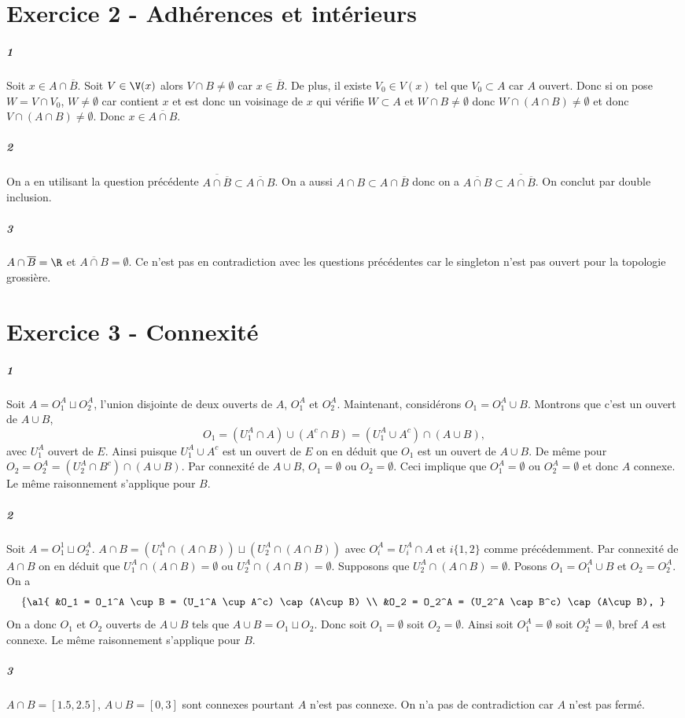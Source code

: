 \documentclass[10pt,a4paper]{article}
\begin{document}
\section{Exercice 2 - Adhérences et intérieurs}
\subparagraph{1} Soit $x \in A \cap \overline{B}$. Soit $V \in \V(x)$ alors $V\cap B \neq \emptyset$ car $x \in \overline{B}$. De plus, il existe $V_0 \in V(x)$ tel que $V_0 \subset A$ car $A$ ouvert. Donc si on pose $W = V \cap V_0$, $W\neq \emptyset$ car contient $x$ et est donc un voisinage de $x$ qui vérifie $W \subset A$ et $W \cap B \neq \emptyset$ donc $W \cap (A \cap B) \neq \emptyset$ et donc $V \cap (A \cap B) \neq \emptyset$. Donc $x \in \overline{A \cap B}$.
\subparagraph{2} On a en utilisant la question précédente $\overline{A \cap \overline{B}} \subset \overline{A \cap B}$. On a aussi $A \cap B \subset A \cap \overline{B}$ donc on a $ \overline{A \cap B} \subset \overline{A \cap \overline{B}}$. On conclut par double inclusion.
\subparagraph{3}$A\cap \overline{B} = \R$ et $\overline{A \cap B} = \emptyset$. Ce n'est pas en contradiction avec les questions précédentes car le singleton n'est pas ouvert pour la topologie grossière.
\section{Exercice 3 - Connexité}
\subparagraph{1}Soit $A = O_1^A \sqcup O_2^A$, l'union disjointe de deux ouverts de $A$, $O_1^A$ et $O_2^A$. Maintenant, considérons $O_1 = O_1^A \cup B$. Montrons que c'est un ouvert de $A \cup B$,
\[O_1 = \left(U_1^A \cap A\right) \cup \left(A^c \cap B \right)  = \left(U_1^A \cup  A^c\right) \cap (A\cup B),\]
avec $U_1^A$ ouvert de $E$. Ainsi puisque $U_1^A \cup  A^c$ est un ouvert de $E$ on en déduit que $O_1$ est un ouvert de $A \cup B$. De même pour $O_2 = O_2^A  = (U_2^A \cap B^c) \cap (A \cup B)$. Par connexité de $A \cup B$, $O_1 = \emptyset$ ou $O_2 = \emptyset$. Ceci implique que $O_1^A = \emptyset$ ou $O_2^A = \emptyset$ et donc $A$ connexe. Le même raisonnement s'applique pour $B$.
\subparagraph{2}Soit $A = O_1^1 \sqcup O_2^A$. $A\cap B = \left(U_1^A \cap (A\cap B) \right) \sqcup \left(U_2^A \cap (A\cap B) \right)$ avec $O_i^A = U_i^A \cap A$ et $ i \lbrace 1,2 \rbrace$ comme précédemment. Par connexité de $A\cap B$ on en déduit que $U_1^A \cap (A \cap B) = \emptyset$ ou $U_2^A \cap (A \cap B) = \emptyset$. Supposons que $U_2^A \cap (A \cap B) = \emptyset$. Posons $O_1 = O_1^A \cup B$ et $O_2 = O_2^A$. On a
\[\left\lbrace
    \al{
      &O_1 = O_1^A \cup B = (U_1^A \cup A^c) \cap (A\cup B) \\
      &O_2 = O_2^A = (U_2^A \cap B^c) \cap (A\cup B),
      }\right.
  \]
  On a donc $O_1$ et $O_2$ ouverts de $A\cup B$ tels que $A\cup B = O_1 \sqcup O_2$. Donc soit $O_1 = \emptyset$ soit $O_2 = \emptyset$. Ainsi soit $O_1^A = \emptyset$ soit $O_2^A = \emptyset$, bref $A$ est connexe. Le même raisonnement s'applique pour $B$.
  \subparagraph{3}
  $A\cap B = [1.5,2.5]$, $A\cup B = [0,3]$ sont connexes pourtant $A$ n'est pas connexe. On n'a pas de contradiction car $A$ n'est pas fermé.
\end{document}
